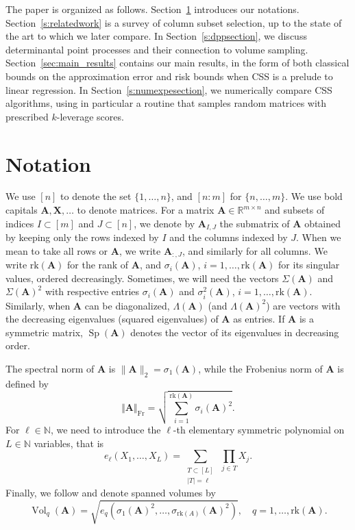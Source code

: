 \documentclass[twoside,11pt]{book}
\numberwithin{theorem}{chapter}
\numberwithin{definition}{chapter}
\numberwithin{proposition}{chapter}
\numberwithin{corollary}{chapter}
\numberwithin{example}{chapter}
\numberwithin{lemma}{chapter}
\DeclareMathOperator{\Sp}{\mathrm{Sp}}
\DeclareMathOperator{\Vol}{Vol}
\DeclareMathOperator{\Fr}{\mathrm{Fr}}
\def\rk{\text{rk}}
\begin{document}
The paper is organized as follows. Section~\ref{s:notation} introduces our notations. Section~\ref{s:relatedwork} is a survey of column subset selection, up to the state of the art to which we later compare. In Section~\ref{s:dppsection}, we discuss determinantal point processes and their connection to volume sampling. Section~\ref{sec:main_results} contains our main results, in the form of both classical bounds on the approximation error and risk bounds when CSS is a prelude to linear regression. In Section~\ref{s:numexpesection}, we numerically compare CSS algorithms, using in particular a routine that samples random matrices with prescribed $k$-leverage scores.

\section{Notation}
\label{s:notation}
We use $[n]$ to denote the set $\{1,\dots,n\}$, and $[n:m]$ for $\{n,\dots,m\}$. We use bold capitals $\bm{A},\bm{X},\dots$ to denote matrices. For a matrix $\bm{A} \in \mathbb{R}^{m \times n}$ and subsets of indices $I\subset[m]$ and $J\subset[n]$, we denote by $\bm{A}_{I,J}$ the submatrix of $\bm{A}$ obtained by keeping only the rows indexed by $I$ and the columns indexed by $J$. When we mean to take all rows or $\bm{A}$, we write $\bm A_{:,J}$, and similarly for all columns. We write $\rk (\bm{A})$ for the rank of $\bm{A}$, and $\sigma_i(\bm A)$, $i=1,\dots,\rk(\bm{A})$ for its singular values, ordered decreasingly. Sometimes, we will need the vectors $\Sigma(\bm{A})$ and $\Sigma(\bm{A})^2$ with respective entries $\sigma_i(\bm{A})$ and $\sigma_i^2(\bm{A})$, $i=1,\dots,\rk(\bm{A})$. Similarly, when $\bm{A}$ can be diagonalized, $\Lambda(\bm{A})$ (and $\Lambda(\bm{A})^2$) are vectors with the decreasing eigenvalues (squared eigenvalues) of $\bm{A}$ as entries. If $\bm{A}$ is a symmetric matrix, $\Sp(\bm{A})$ denotes the vector of its eigenvalues in decreasing order.

The spectral norm of $\bm{A}$ is $\|\bm{A}\|_{2} = \sigma_{1}(\bm A)$, while the Frobenius norm of $\bm{A}$ is defined by
$$\Vert\bm{A}\Vert_{\Fr} = \sqrt{\sum_{i=1}^{\rk(\bm{A})} \sigma_{i}(\bm{A})^{2}}.$$
For $\ell \in \mathbb{N}$, we need to introduce the $\ell$-th elementary symmetric polynomial on $L \in \mathbb{N}$ variables, that is
\begin{equation}
e_{\ell}(X_{1}, \dots, X_{L}) = \sum\limits_{\substack{T \subset [L]\\|T| = \ell}}~ \prod\limits_{j \in T} X_{j}.
\end{equation}
Finally, we follow \cite{Ben92} and denote spanned volumes by
$$\Vol_{q}(\bm{A}) = \sqrt{e_{q}\left(\sigma_{1}(\bm{A})^{2},\dots,\sigma_{\rk(A)}(\bm{A})^2\right)}, \quad q=1,\dots,\rk(\bm{A}).$$
\end{document}
